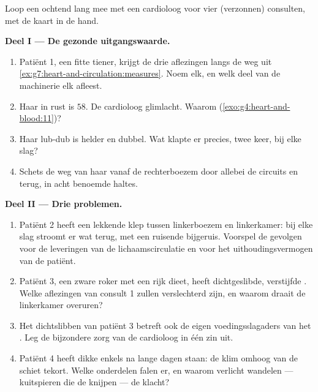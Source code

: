 \begin{problem}\label{pb:g7:heart-and-circulation:1}
Loop een ochtend lang mee met een cardioloog voor vier (verzonnen)
consulten, met de kaart in de hand.

\medskip\noindent\textbf{Deel I --- De gezonde
uitgangswaarde.}
\begin{enumerate}
  \item Patiënt 1, een fitte tiener, krijgt de drie aflezingen langs de
        weg uit \cref{ex:g7:heart-and-circulation:measures}. Noem elk, en
        welk deel van de machinerie elk afleest.
  \item Haar  in rust is $58$. De cardioloog glimlacht. Waarom
        (\cref{exo:g4:heart-and-blood:11})?
  \item Haar lub-dub is helder en dubbel. Wat klapte er precies, twee
        keer, bij elke slag?
  \item Schets de weg van haar  vanaf de rechterboezem door allebei
        de circuits en terug, in acht benoemde haltes.
\end{enumerate}

\medskip\noindent\textbf{Deel II --- Drie problemen.}
\begin{enumerate}[resume]
  \item Patiënt 2 heeft een lekkende klep tussen linkerboezem en
        linkerkamer: bij elke slag stroomt er wat  terug, met een
        ruisende bijgeruis. Voorspel de gevolgen voor de leveringen van
        de lichaamscirculatie en voor het uithoudingsvermogen van de
        patiënt.
  \item Patiënt 3, een zware roker met een rijk dieet, heeft
        dichtgeslibde, verstijfde . Welke aflezingen van consult
        1 zullen verslechterd zijn, en waarom draait de linkerkamer
        overuren?
  \item Het dichtslibben van patiënt 3 betreft ook de eigen
        voedingsslagaders van het . Leg de bijzondere zorg van de
        cardioloog in één zin uit.
  \item Patiënt 4 heeft dikke enkels na lange dagen staan: de klim
        omhoog van de  schiet tekort. Welke onderdelen falen er, en
        waarom verlicht wandelen --- kuitspieren die de  knijpen ---
        de klacht?
\end{enumerate}


\end{problem}

